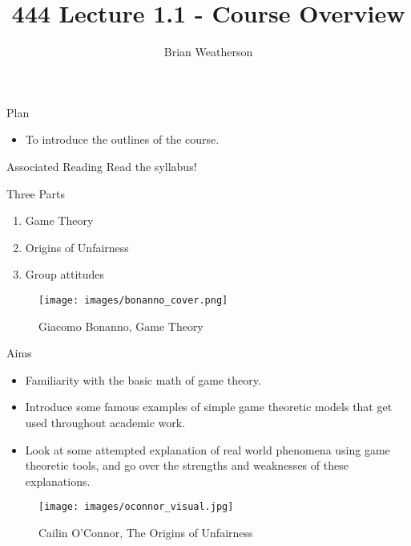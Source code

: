 \documentclass[
  ignorenonframetext,
]{beamer}
\title{444 Lecture 1.1 - Course Overview}
\author{Brian Weatherson}
\date{}
\providecommand{\tightlist}{%
  \setlength{\itemsep}{0pt}\setlength{\parskip}{0pt}}
\begin{document}
\frame{\titlepage}

\begin{frame}{Plan}
\protect\hypertarget{plan}{}
\begin{itemize}
\tightlist
\item
  To introduce the outlines of the course.
\end{itemize}
\end{frame}

\begin{frame}{Associated Reading}
\protect\hypertarget{associated-reading}{}
Read the syllabus!
\end{frame}

\begin{frame}{Three Parts}
\protect\hypertarget{three-parts}{}
\begin{enumerate}
\tightlist
\item
  Game Theory
\item
  Origins of Unfairness
\item
  Group attitudes
\end{enumerate}
\end{frame}

\begin{frame}
\begin{figure}
\centering
\texttt{[image: images/bonanno\_cover.png]}
\caption{Giacomo Bonanno, Game Theory}
\end{figure}
\end{frame}

\begin{frame}{Aims}
\protect\hypertarget{aims}{}
\begin{itemize}
\tightlist
\item
  Familiarity with the basic math of game theory.
\item
  Introduce some famous examples of simple game theoretic models that
  get used throughout academic work.
\item
  Look at some attempted explanation of real world phenomena using game
  theoretic tools, and go over the strengths and weaknesses of these
  explanations.
\end{itemize}
\end{frame}

\begin{frame}
\begin{figure}
\centering
\texttt{[image: images/oconnor\_visual.jpg]}
\caption{Cailin O'Connor, The Origins of Unfairness}
\end{figure}
\end{frame}
\end{document}
